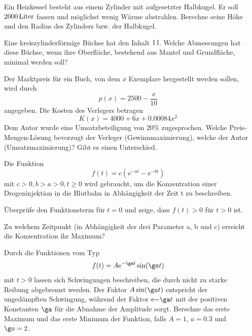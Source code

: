 \documentclass[%
11pt,%
twoside,%
titlepage,%
german,%
headsepline%
]{scrartcl}
\begin{document}
\begin{ueb}[Heizkessel]
 Ein Heizkessel besteht aus einem Zylinder mit aufgesetzter Halbkugel. Er soll $\unit[2000]{Liter}$ fassen und m\"oglichst wenig W\"arme abstrahlen. Berechne seine Höhe und den Radius des Zylinders bzw. der Halbkugel.
 \end{ueb}

\begin{ueb}[Büchse]
Eine
kreiszylinderf\"ormige B\"uchse hat den Inhalt $\unit[1]{l}$. Welche Abmessungen hat diese B\"uchse, wenn ihre Oberfl\"ache, bestehend aus Mantel und Grundfl\"ache, minimal werden soll?
\end{ueb}

\begin{ueb}[Marktpreis]
Der Marktpreis f\"ur ein Buch, von dem $x$ Exemplare hergestellt werden sollen, wird durch
$$p(x)=2500-\frac{x}{10}$$
angegeben. Die Kosten des Verlegers betragen
$$K(x)=4000+6x+0.00084x^2$$
Dem Autor wurde eine Umsatzbeteiligung von 20\% zugesprochen. Welche Preis-Mengen-L\"osung bevorzugt der Verleger (Gewinnmaximierung), welche der Autor (Umsatzmaximierung)? Gibt es einen   Unterschied.
\end{ueb}

\begin{ueb}[Drogen]
Die
Funktion
$$f(t)=c\left(\mathrm{e}^{-at}-\mathrm{e}^{-bt}\right)$$
mit $c>0, b>a>0, t\geq0$ wird gebraucht, um die Konzentration einer Drogeninjektion in die Blutbahn in Abh\"angigkeit der Zeit t zu beschreiben.
\begin{enumeratea}
\item \"Uberpr\"ufe den Funktionsterm f\"ur $t = 0$ und zeige,
dass $f(t) >0$ f\"ur $t >0$ ist.
\item Zu welchem Zeitpunkt (in Abh\"angigkeit der drei Parameter a, b und c) erreicht die Konzentration ihr Maximum?
\end{enumeratea}
\end{ueb}

\begin{ueb}
Durch
die Funktionen vom Typ
$$f(t)=A\mathrm{e}^{-\ga t}\sin(\go t)$$
mit $t>0$ lassen sich Schwingungen beschreiben, die durch nicht zu starke Reibung abgebremst werden. Der Faktor $A\sin(\go t)$ entspricht der unged\"ampften Schwingung, w\"ahrend der Faktor $\mathrm{e}{-\ga t}$ mit der positiven Konstanten $\ga$ f\"ur die Abnahme der Amplitude sorgt. Berechne das erste Maximum und das erste Minimum der Funktion, falls $A = 1$, $a = 0.3$ und $\go=2$.
\end{ueb}
\end{document}
